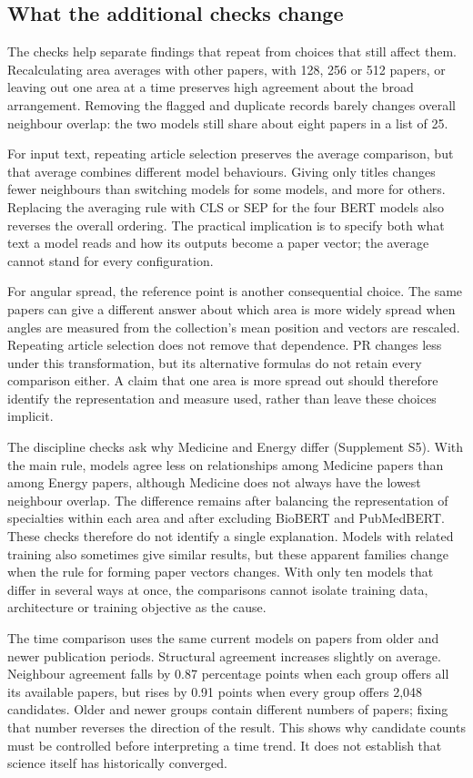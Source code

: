 \documentclass[12pt]{article}
\begin{document}
\subsection{What the additional checks change}
The checks help separate findings that repeat from choices that still affect them. Recalculating area averages with other papers, with 128, 256 or 512 papers, or leaving out one area at a time preserves high agreement about the broad arrangement. Removing the flagged and duplicate records barely changes overall neighbour overlap: the two models still share about eight papers in a list of 25.

For input text, repeating article selection preserves the average comparison, but that average combines different model behaviours. Giving only titles changes fewer neighbours than switching models for some models, and more for others. Replacing the averaging rule with CLS or SEP for the four BERT models also reverses the overall ordering. The practical implication is to specify both what text a model reads and how its outputs become a paper vector; the average cannot stand for every configuration.

For angular spread, the reference point is another consequential choice. The same papers can give a different answer about which area is more widely spread when angles are measured from the collection's mean position and vectors are rescaled. Repeating article selection does not remove that dependence. PR changes less under this transformation, but its alternative formulas do not retain every comparison either. A claim that one area is more spread out should therefore identify the representation and measure used, rather than leave these choices implicit.

The discipline checks ask why Medicine and Energy differ (Supplement S5). With the main rule, models agree less on relationships among Medicine papers than among Energy papers, although Medicine does not always have the lowest neighbour overlap. The difference remains after balancing the representation of specialties within each area and after excluding BioBERT and PubMedBERT. These checks therefore do not identify a single explanation. Models with related training also sometimes give similar results, but these apparent families change when the rule for forming paper vectors changes. With only ten models that differ in several ways at once, the comparisons cannot isolate training data, architecture or training objective as the cause.

The time comparison uses the same current models on papers from older and newer publication periods. Structural agreement increases slightly on average. Neighbour agreement falls by 0.87 percentage points when each group offers all its available papers, but rises by 0.91 points when every group offers 2,048 candidates. Older and newer groups contain different numbers of papers; fixing that number reverses the direction of the result. This shows why candidate counts must be controlled before interpreting a time trend. It does not establish that science itself has historically converged.
\end{document}
